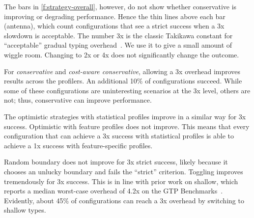 The bars in \cref{f:strategy-overall}, however, do not show whether conservative
is improving or degrading performance.
Hence the thin lines above each bar (antenna), which count configurations that see
a strict success when a 3x slowdown is acceptable.
The number 3x is the classic Takikawa constant for ``acceptable'' gradual typing
overhead~\cite{tfgnvf-popl-2016,vss-popl-2017,bbst-oopsla-2017}.
We use it to give a small amount of wiggle room.
Changing to 2x or 4x does not significantly change the outcome.

For \emph{conservative} and \emph{cost-aware conservative}, allowing a 3x overhead
improves results across the profilers.
An additional 10\% of configurations succeed.
While some of these configurations are uninteresting scenarios at the 3x level,
others are not; thus, conservative can improve performance.

The optimistic strategies with statistical profiles improve in a similar way
for 3x success.
Optimistic with feature profiles does not improve.
This means that every configuration that can achieve a 3x success with statistical
profiles is able to achieve a 1x success with feature-specific profiles.

Random boundary does not improve for 3x strict success, likely because it chooses
an unlucky boundary and fails the ``strict'' criterion.
Toggling improves tremendously for 3x success.
This is in line with prior work on shallow, which reports a median worst-case overhead
of 4.2x on the GTP Benchmarks~\cite{g-deep-shallow}.
Evidently, about 45\% of configurations can reach a 3x overhead by switching to
shallow types.


